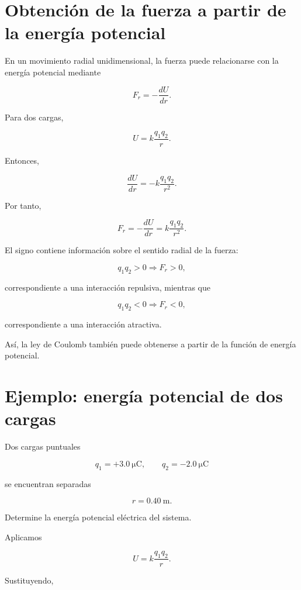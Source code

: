 \section{Obtención de la fuerza a partir de la energía potencial}

En un movimiento radial unidimensional, la fuerza puede relacionarse con la energía
potencial mediante

\begin{equation}
\boxed{
F_r=-\frac{dU}{dr}
}.
\label{eq:fuerza_desde_energia}
\end{equation}

Para dos cargas,

\[
U=k\frac{q_1q_2}{r}.
\]

Entonces,

\[
\frac{dU}{dr}
=
-k\frac{q_1q_2}{r^2}.
\]

Por tanto,

\[
F_r
=
-\frac{dU}{dr}
=
k\frac{q_1q_2}{r^2}.
\]

El signo contiene información sobre el sentido radial de la fuerza:

\[
q_1q_2>0
\Longrightarrow
F_r>0,
\]

correspondiente a una interacción repulsiva, mientras que

\[
q_1q_2<0
\Longrightarrow
F_r<0,
\]

correspondiente a una interacción atractiva.

Así, la ley de Coulomb también puede obtenerse a partir de la función de energía
potencial.


\section{Ejemplo: energía potencial de dos cargas}

\begin{ejemplo}

Dos cargas puntuales

\[
q_1=+\SI{3.0}{\micro\coulomb},
\qquad
q_2=-\SI{2.0}{\micro\coulomb}
\]

se encuentran separadas

\[
r=\SI{0.40}{\metre}.
\]

Determine la energía potencial eléctrica del sistema.

\end{ejemplo}

Aplicamos

\[
U=k\frac{q_1q_2}{r}.
\]

Sustituyendo,

